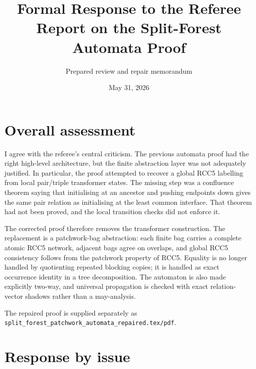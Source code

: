\documentclass[11pt]{article}
\title{Formal Response to the Referee Report on the Split-Forest Automata Proof}
\author{Prepared review and repair memorandum}
\date{May 31, 2026}
\begin{document}
\maketitle

\section*{Overall assessment}

I agree with the referee's central criticism.  The previous automata proof had the right
high-level architecture, but the finite abstraction layer was not adequately justified.
In particular, the proof attempted to recover a global RCC5 labelling from local
pair/triple transformer states.  The missing step was a confluence theorem saying that
initialising at an ancestor and pushing endpoints down gives the same pair relation as
initialising at the least common interface.  That theorem had not been proved, and the
local transition checks did not enforce it.

The corrected proof therefore removes the transformer construction.  The replacement is
a patchwork-bag abstraction: each finite bag carries a complete atomic RCC5 network,
adjacent bags agree on overlaps, and global RCC5 consistency follows from the patchwork
property of RCC5.  Equality is no longer handled by quotienting repeated blocking copies;
it is handled as exact occurrence identity in a tree decomposition.  The automaton is
also made explicitly two-way, and universal propagation is checked with exact
relation-vector shadows rather than a may-analysis.

The repaired proof is supplied separately as
\texttt{split\_forest\_patchwork\_automata\_repaired.tex/pdf}.

\section*{Response by issue}
\end{document}
